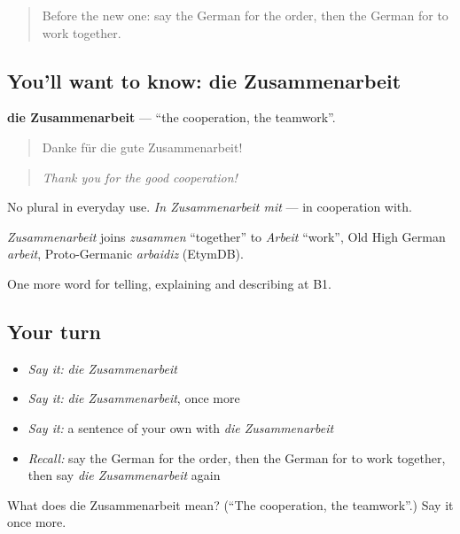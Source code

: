 \begin{quote}
Before the new one: say the German for the order, then the German for to work together.
\end{quote}

\subsection*{You'll want to know: die Zusammenarbeit}
\textbf{die Zusammenarbeit} — \textquotedblleft{}the cooperation, the teamwork\textquotedblright{}.

\begin{quote}
Danke für die gute Zusammenarbeit!
\end{quote}

\begin{quote}
\emph{Thank you for the good cooperation!}
\end{quote}

No plural in everyday use. \emph{In Zusammenarbeit mit} — in cooperation with.

\begin{cousinweb}
\emph{Zusammenarbeit} joins \emph{zusammen} \textquotedblleft{}together\textquotedblright{} to \emph{Arbeit} \textquotedblleft{}work\textquotedblright{}, Old High German \emph{arbeit}, Proto-Germanic \emph{arbaidiz} (EtymDB).
\end{cousinweb}

\begin{grammarlens}[title={What you've built}]
One more word for telling, explaining and describing at B1.
\end{grammarlens}

\subsection*{Your turn}
\begin{itemize}
\raggedright
  \item \emph{Say it:} \emph{die Zusammenarbeit}
  \item \emph{Say it:} \emph{die Zusammenarbeit}, once more
  \item \emph{Say it:} a sentence of your own with \emph{die Zusammenarbeit}
  \item \emph{Recall:} say the German for the order, then the German for to work together, then say \emph{die Zusammenarbeit} again
\end{itemize}

\begin{tcolorbox}[breakable,colback=teal!4,colframe=teal!35!black,title={Before you move on}]
What does die Zusammenarbeit mean? (\textquotedblleft{}The cooperation, the teamwork\textquotedblright{}.) Say it once more.
\end{tcolorbox}
